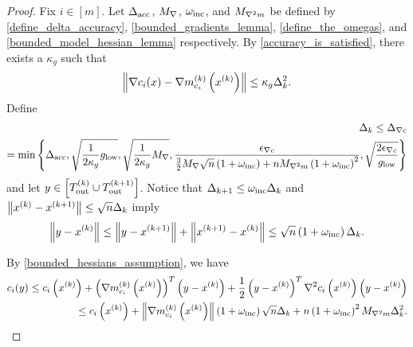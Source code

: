 \begin{proof}

Fix $i \in [m]$.
Let
${\Delta_{\textrm{acc}}}$,
${M_{\nabla}}$,
$\omega_{\text{inc}}$, 
and ${M_{\nabla^2 m}}$
be defined by
\cref{define_delta_accuracy},
\cref{bounded_gradients_lemma},
\cref{define_the_omegas},
and \cref{bounded_model_hessian_lemma}
respectively.
By \cref{accuracy_is_satisfied}, there exists a $\kappa_g$ such that
\begin{align}
\label{oszm_accuracy}
\left\|\nabla c_i(x) - {\nabla m_{c_i}^{(k)}\left(x^{(k)}\right)}\right\| \le \kappa_g \Delta_k^2.
\end{align}
Define
\begin{align}
\Delta_k \le {\Delta_{\nabla c}} \nonumber \\= \min\left\{
{\Delta_{\textrm{acc}}},
\sqrt{\frac 1 {2\kappa_g} { g_{\textrm{low}} }},
\sqrt{\frac 1 {2\kappa_g} {M_{\nabla}}},
\frac{{\epsilon_{\nabla c}}}{\frac 3 2 {M_{\nabla}}\sqrt{n}\left(1 + \omega_{\text{inc}}\right) + n {M_{\nabla^2 m}} \left(1 + \omega_{\text{inc}}\right)^2},
\sqrt{\frac{2{\epsilon_{\nabla c}}}{{ g_{\textrm{low}} }}}
\right\} \label{define_mingraddelta}
\end{align}
and let $y\in \left[{T_{\text{out}}^{(k)}} \cup {T_{\text{out}}^{(k+1)}}\right]$.
Notice that $\Delta_{k+1} \le \omega_{\text{inc}} \Delta_k$ and $\left\|x^{(k)} - {{x}^{(k+1)}}\right\| \le \sqrt{n}\Delta_k$ imply
\begin{align*}
\left\|y - x^{(k)}\right\| \le \left\|y - {{x}^{(k+1)}}\right\| + \left\|{{x}^{(k+1)}} - x^{(k)}\right\| \le \sqrt{n}\left(1 + \omega_{\text{inc}}\right)\Delta_k.
\end{align*}

By \cref{bounded_hessians_assumption}, we have
\begin{align}
c_i(y) \le c_i\left(x^{(k)}\right) + \left({\nabla m_{c_i}^{(k)}\left(x^{(k)}\right)}\right)^T\left(y - x^{(k)}\right) + \frac 1 2 \left(y - x^{(k)}\right)^T\nabla^2{c_i}\left(x^{(k)}\right)\left(y - x^{(k)}\right) \nonumber \\
\le c_i\left(x^{(k)}\right) + \left\|{\nabla m_{c_i}^{(k)}\left(x^{(k)}\right)}\right\|\left(1 + \omega_{\text{inc}}\right) \sqrt{n}\Delta_k +n \left(1 + \omega_{\text{inc}}\right)^2{M_{\nabla^2 m}}\Delta_k^2.
\label{oszm_first_bound}
\end{align}


\end{proof}
